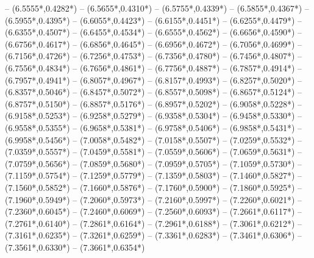 {	-- ({6.5555*\dx},{0.4282*\dy})
	-- ({6.5655*\dx},{0.4310*\dy})
	-- ({6.5755*\dx},{0.4339*\dy})
	-- ({6.5855*\dx},{0.4367*\dy})
	-- ({6.5955*\dx},{0.4395*\dy})
	-- ({6.6055*\dx},{0.4423*\dy})
	-- ({6.6155*\dx},{0.4451*\dy})
	-- ({6.6255*\dx},{0.4479*\dy})
	-- ({6.6355*\dx},{0.4507*\dy})
	-- ({6.6455*\dx},{0.4534*\dy})
	-- ({6.6555*\dx},{0.4562*\dy})
	-- ({6.6656*\dx},{0.4590*\dy})
	-- ({6.6756*\dx},{0.4617*\dy})
	-- ({6.6856*\dx},{0.4645*\dy})
	-- ({6.6956*\dx},{0.4672*\dy})
	-- ({6.7056*\dx},{0.4699*\dy})
	-- ({6.7156*\dx},{0.4726*\dy})
	-- ({6.7256*\dx},{0.4753*\dy})
	-- ({6.7356*\dx},{0.4780*\dy})
	-- ({6.7456*\dx},{0.4807*\dy})
	-- ({6.7556*\dx},{0.4834*\dy})
	-- ({6.7656*\dx},{0.4861*\dy})
	-- ({6.7756*\dx},{0.4887*\dy})
	-- ({6.7857*\dx},{0.4914*\dy})
	-- ({6.7957*\dx},{0.4941*\dy})
	-- ({6.8057*\dx},{0.4967*\dy})
	-- ({6.8157*\dx},{0.4993*\dy})
	-- ({6.8257*\dx},{0.5020*\dy})
	-- ({6.8357*\dx},{0.5046*\dy})
	-- ({6.8457*\dx},{0.5072*\dy})
	-- ({6.8557*\dx},{0.5098*\dy})
	-- ({6.8657*\dx},{0.5124*\dy})
	-- ({6.8757*\dx},{0.5150*\dy})
	-- ({6.8857*\dx},{0.5176*\dy})
	-- ({6.8957*\dx},{0.5202*\dy})
	-- ({6.9058*\dx},{0.5228*\dy})
	-- ({6.9158*\dx},{0.5253*\dy})
	-- ({6.9258*\dx},{0.5279*\dy})
	-- ({6.9358*\dx},{0.5304*\dy})
	-- ({6.9458*\dx},{0.5330*\dy})
	-- ({6.9558*\dx},{0.5355*\dy})
	-- ({6.9658*\dx},{0.5381*\dy})
	-- ({6.9758*\dx},{0.5406*\dy})
	-- ({6.9858*\dx},{0.5431*\dy})
	-- ({6.9958*\dx},{0.5456*\dy})
	-- ({7.0058*\dx},{0.5482*\dy})
	-- ({7.0158*\dx},{0.5507*\dy})
	-- ({7.0259*\dx},{0.5532*\dy})
	-- ({7.0359*\dx},{0.5557*\dy})
	-- ({7.0459*\dx},{0.5581*\dy})
	-- ({7.0559*\dx},{0.5606*\dy})
	-- ({7.0659*\dx},{0.5631*\dy})
	-- ({7.0759*\dx},{0.5656*\dy})
	-- ({7.0859*\dx},{0.5680*\dy})
	-- ({7.0959*\dx},{0.5705*\dy})
	-- ({7.1059*\dx},{0.5730*\dy})
	-- ({7.1159*\dx},{0.5754*\dy})
	-- ({7.1259*\dx},{0.5779*\dy})
	-- ({7.1359*\dx},{0.5803*\dy})
	-- ({7.1460*\dx},{0.5827*\dy})
	-- ({7.1560*\dx},{0.5852*\dy})
	-- ({7.1660*\dx},{0.5876*\dy})
	-- ({7.1760*\dx},{0.5900*\dy})
	-- ({7.1860*\dx},{0.5925*\dy})
	-- ({7.1960*\dx},{0.5949*\dy})
	-- ({7.2060*\dx},{0.5973*\dy})
	-- ({7.2160*\dx},{0.5997*\dy})
	-- ({7.2260*\dx},{0.6021*\dy})
	-- ({7.2360*\dx},{0.6045*\dy})
	-- ({7.2460*\dx},{0.6069*\dy})
	-- ({7.2560*\dx},{0.6093*\dy})
	-- ({7.2661*\dx},{0.6117*\dy})
	-- ({7.2761*\dx},{0.6140*\dy})
	-- ({7.2861*\dx},{0.6164*\dy})
	-- ({7.2961*\dx},{0.6188*\dy})
	-- ({7.3061*\dx},{0.6212*\dy})
	-- ({7.3161*\dx},{0.6235*\dy})
	-- ({7.3261*\dx},{0.6259*\dy})
	-- ({7.3361*\dx},{0.6283*\dy})
	-- ({7.3461*\dx},{0.6306*\dy})
	-- ({7.3561*\dx},{0.6330*\dy})
	-- ({7.3661*\dx},{0.6354*\dy})
}
